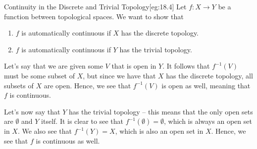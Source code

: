\begin{egBox}{Continuity in the Discrete and Trivial Topology}[eg:18.4]
    Let \( f: X \rightarrow Y \) be a function between topological spaces.
    We want to show that 
    \begin{enumerate}[label = (\alph*)]
        \item \( f \) is automatically continuous if \( X \) has the discrete
            topology.
        \item \( f \) is automatically continuous if \( Y \) has the trivial 
            topology.
    \end{enumerate}

    \baseSkip


    Let's say that we are given some \( V \) that is open in \( Y \).
    It follows that \( f^{ -1 } ( V ) \) must be some subset of \( X \), but 
    since we have that \( X \) has the discrete topology, all subsets of \( X \)
    are open.
    Hence, we see that \( f^{ -1 } ( V ) \) is open as well, meaning that 
    \( f \) is continuous.

    \baseSkip


    Let's now say that \( Y \) has the trivial topology -- this means that 
    the only open sets are \( \emptyset \) and \( Y \) itself.
    It is clear to see that \( f^{ -1 } ( \emptyset ) = \emptyset \), which
    is always an open set in \( X \).
    We also see that \( f^{ -1 } ( Y ) = X \), which is also an open set in 
    \( X \).
    Hence, we see that \( f \) is continuous as well.
\end{egBox}


